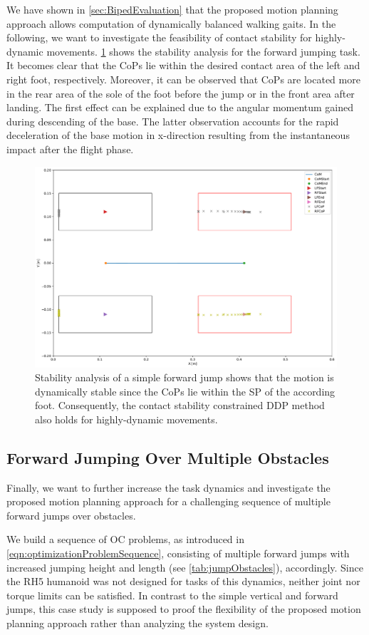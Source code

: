 We have shown in \cref{sec:BipedEvaluation} that the proposed motion planning approach allows computation of dynamically balanced walking gaits. In the following, we want to investigate the feasibility of contact stability for highly-dynamic movements. \cref{fig:jumpForward_StabilityAnalysis} shows the stability analysis for the forward jumping task. It becomes clear that the \gls{CoP}s lie within the desired contact area of the left and right foot, respectively. Moreover, it can be observed that \gls{CoP}s are located more in the rear area of the sole of the foot before the jump or in the front area after landing. The first effect can be explained due to the angular momentum gained during descending of the base. The latter observation accounts for the rapid deceleration of the base motion in x-direction resulting from the instantaneous impact after the flight phase.    
\begin{figure}
\centering	
\includegraphics[width=.7\textwidth]{fig/jumpForward/StabilityAnalysis}
\caption[Stability analysis of a simple forward jump]{Stability analysis of a simple forward jump shows that the motion is dynamically stable since the \gls{CoP}s lie within the \gls{SP} of the according foot. Consequently, the contact stability constrained \gls{DDP} method also holds for highly-dynamic movements. }
\label{fig:jumpForward_StabilityAnalysis}
\end{figure} 

\subsection{Forward Jumping Over Multiple Obstacles}
Finally, we want to further increase the task dynamics and investigate the proposed motion planning approach for a challenging sequence of multiple forward jumps over obstacles. 

We build a sequence of \gls{OC} problems, as introduced in \cref{eqn:optimizationProblemSequence}, consisting of multiple forward jumps with increased jumping height and length (see \cref{tab:jumpObstacles}), accordingly. Since the RH5 humanoid was not designed for tasks of this dynamics, neither joint nor torque limits can be satisfied. In contrast to the simple vertical and forward jumps, this case study is supposed to proof the flexibility of the proposed motion planning approach rather than analyzing the system design. 


